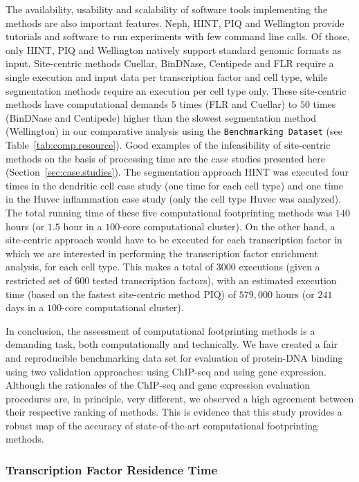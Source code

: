 The availability, usability and scalability of software tools implementing the methods are also important features. Neph, HINT, PIQ and Wellington provide tutorials and software to run experiments with few command line calls. Of those, only HINT, PIQ and Wellington natively support standard genomic formats as input. Site-centric methods Cuellar, BinDNase, Centipede and FLR require a single execution and input data per transcription factor and cell type, while segmentation methods require an execution per cell type only. These site-centric methods have computational demands $5$ times (FLR and Cuellar) to $50$ times (BinDNase and Centipede) higher than the slowest segmentation method (Wellington) in our comparative analysis using the {\tt Benchmarking Dataset} (see Table~\ref{tab:comp.resource}). Good examples of the infeasibility of site-centric methods on the basis of processing time are the case studies presented here (Section~\ref{sec:case.studies}). The segmentation approach HINT was executed four times in the dendritic cell case study (one time for each cell type) and one time in the Huvec inflammation case study (only the cell type Huvec was analyzed). The total running time of these five computational footprinting methods was \approxy$140$ hours (or \approxy$1.5$ hour in a $100$-core computational cluster). On the other hand, a site-centric approach would have to be executed for each transcription factor in which we are interested in performing the transcription factor enrichment analysis, for each cell type. This makes a total of \approxy$3000$ executions (given a restricted set of $600$ tested transcription factors), with an estimated execution time (based on the fastest site-centric method PIQ) of $579,000$ hours (or $241$ days in a $100$-core computational cluster).

In conclusion, the assessment of computational footprinting methods is a demanding task, both computationally and technically. We have created a fair and reproducible benchmarking data set for evaluation of protein-DNA binding using two validation approaches: using ChIP-seq and using gene expression. Although the rationales of the ChIP-seq and gene expression evaluation procedures are, in principle, very different, we observed a high agreement between their respective ranking of methods. This is evidence that this study provides a robust map of the accuracy of state-of-the-art computational footprinting methods.

\subsubsection{Transcription Factor Residence Time}

